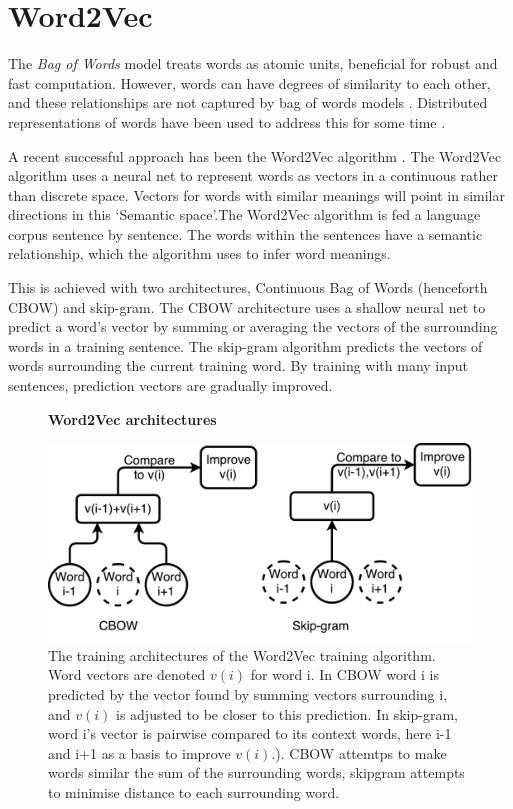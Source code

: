 \section{Word2Vec}
\label{sec:WORD2VEC}
The \emph{Bag of Words} model treats words as atomic units, beneficial for robust and fast computation. However, words can have degrees of similarity to each other, and these relationships are not captured by bag of words models \cite{word2veckingqueen}. Distributed representations of words have been used to address this for some time \cite{distributedrepresentations}.

 A recent successful approach has been the Word2Vec algorithm \cite{word2vec1} \cite{word2vec2}. The Word2Vec algorithm uses a neural net to represent words as vectors in a continuous rather than discrete space. Vectors for words with similar meanings will point in similar directions in this `Semantic space'.The Word2Vec algorithm is fed a language corpus sentence by sentence. The words within the sentences have a semantic relationship, which the algorithm uses to infer word meanings. 
 
This is achieved with two architectures, Continuous Bag of Words (henceforth CBOW) and skip-gram. The CBOW architecture uses a shallow neural net to predict a word's vector by summing or averaging the vectors of the surrounding words in a training sentence. The skip-gram algorithm predicts the vectors of words surrounding the current training word. By training with many input sentences, prediction vectors are gradually improved. 

\begin{figure}[H]
    \centering
    \textbf{Word2Vec architectures}\par\medskip
    \includegraphics[width=\textwidth]{Natural_Language_Processing/cbow_v_skip.pdf}
    \caption{The training architectures of the Word2Vec training algorithm. Word vectors are denoted $v(i)$ for word i. In CBOW word i is predicted by the vector found by summing vectors surrounding i, and $v(i)$ is adjusted to be closer to this prediction. In skip-gram, word i's vector is pairwise compared to its context words, here i-1 and i+1 as a basis to improve $v(i)$.). CBOW attemtps to make words similar the sum of the surrounding words, skipgram attempts to minimise distance to each surrounding word.}
     \label{fig:CBOWSKIP}
\end{figure}

